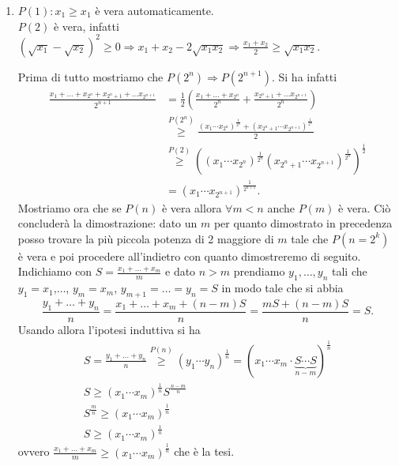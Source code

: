 \begin{enumerate}
\begin{pind}
  \end{pind}
\item \begin{pbase}
    $ P(1) : x_1 \geq x_1 $ è vera automaticamente. \\
    $ P(2) $ è vera, infatti $ (\sqrt{x_1} - \sqrt{x_2})^2 \geq 0 \Rightarrow x_1 + x_2 - 2 \sqrt{x_1 x_2} \Rightarrow \frac{x_1 + x_2}{2} \geq \sqrt{x_1 x_2} $.
  \end{pbase}
  \begin{pind}
    Prima di tutto mostriamo che $ P(2^{n}) \Rightarrow P(2^{n + 1}) $. Si ha infatti
    \begin{align*}
      \frac{x_1 + \dots + x_{2^{n}} + x_{2^{n} + 1} + \dots x_{2^{n + 1}}}{2^{n + 1}} & = \frac{1}{2}\left(\frac{x_1 + \dots + x_{2^{n}}}{2^{n}} + \frac{x_{2^{n} + 1} + \dots x_{2^{n + 1}}}{2^{n}} \right) \\
                                                                                      & \overset{P(2^{n})}{\geq} \frac{(x_1 \cdots x_{2^{n}})^\frac{1}{2^{n}} + (x_{2^n + 1} \cdots x_{2^{n + 1}})^\frac{1}{2^{n}}}{2} \\
                                                                                      & \overset{P(2)}{\geq} \left((x_1 \cdots x_{2^{n}})^\frac{1}{2^{n}} (x_{2^n + 1} \cdots x_{2^{n + 1}})^\frac{1}{2^{n}}\right)^\frac{1}{2} \\
                                                                                      & = (x_1 \cdots x_{2^{n + 1}})^\frac{1}{2^{n + 1}}.
    \end{align*}
    Mostriamo ora che se $ P(n) $ è vera allora $ \forall m < n $ anche $ P(m) $ è vera. Ciò concluderà la dimostrazione: dato un $ m $ per quanto dimostrato in precedenza posso trovare la più piccola potenza di 2 maggiore di $ m $ tale che $ P(n = 2^k) $ è vera e poi procedere all'indietro con quanto dimostreremo di seguito. Indichiamo con $ S = \frac{x_1 + \dots + x_m}{m} $ e dato $ n > m $ prendiamo $ y_1, \dots, y_n $ tali che $ y_1 = x_1 $,$ \dots $, $ y_m = x_m $, $ y_{m + 1} = \dots = y_n = S $ in modo tale che si abbia \[\frac{y_1 + \dots + y_n}{n} = \frac{x_1 + \dots + x_m + (n - m) S}{n} = \frac{m S + (n - m) S}{n} = S.\] Usando allora l'ipotesi induttiva si ha
    \begin{gather*}
      S = \frac{y_1 + \dots + y_n}{n} \overset{P(n)}{\geq} (y_1 \cdots y_n)^\frac{1}{n} = (x_1 \cdots x_m \cdot \underset{n - m}{\underbrace{S \cdots S}})^\frac{1}{n} \\
      S \geq (x_1 \cdots x_m)^\frac{1}{n} S^\frac{n - m}{n} \\
      S^\frac{m}{n} \geq (x_1 \cdots x_m)^\frac{1}{n} \\
      S \geq (x_1 \cdots x_m)^\frac{1}{n}
    \end{gather*}
    ovvero $ \frac{x_1 + \dots + x_m}{m} \geq (x_1 \cdots x_m)^\frac{1}{n} $ che è la tesi.
  \end{pind}
\end{enumerate}

